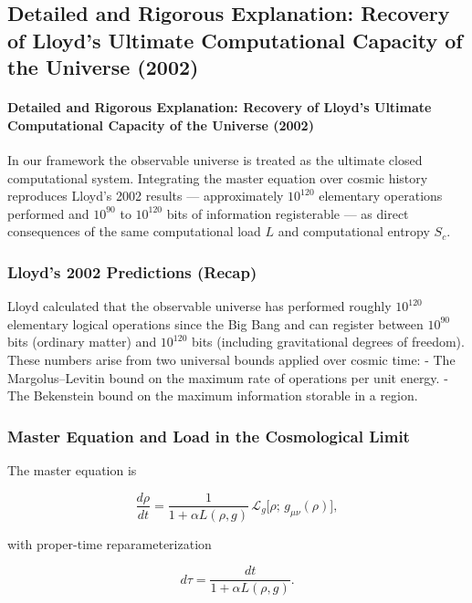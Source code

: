 \documentclass[reprint,amsmath,amssymb,aps,prd,preprintnumbers,superscriptaddress,longbibliography,10pt]{revtex4-2}
\begin{document}
\subsection{Detailed and Rigorous Explanation: Recovery of Lloyd’s Ultimate Computational Capacity of the Universe (2002)}

\paragraph{Detailed and Rigorous Explanation: Recovery of Lloyd's Ultimate Computational Capacity of the Universe (2002)}

In our framework the observable universe is treated as the ultimate closed computational system. Integrating the master equation over cosmic history reproduces Lloyd’s 2002 results — approximately \(10^{120}\) elementary operations performed and \(10^{90}\) to \(10^{120}\) bits of information registerable — as direct consequences of the same computational load \(L\) and computational entropy \(S_c\).

\subsubsection{Lloyd's 2002 Predictions (Recap)}

Lloyd calculated that the observable universe has performed roughly \(10^{120}\) elementary logical operations since the Big Bang and can register between \(10^{90}\) bits (ordinary matter) and \(10^{120}\) bits (including gravitational degrees of freedom). These numbers arise from two universal bounds applied over cosmic time:
- The Margolus–Levitin bound on the maximum rate of operations per unit energy.
- The Bekenstein bound on the maximum information storable in a region.

\subsubsection{Master Equation and Load in the Cosmological Limit}

The master equation is

\[
\frac{d\rho}{dt} = \frac{1}{1 + \alpha L(\rho,g)} \,\mathcal{L}_g\bigl[\rho;\, g_{\mu\nu}(\rho)\bigr],
\]

with proper-time reparameterization

\[
d\tau = \frac{dt}{1 + \alpha L(\rho,g)}.
\]
\end{document}
